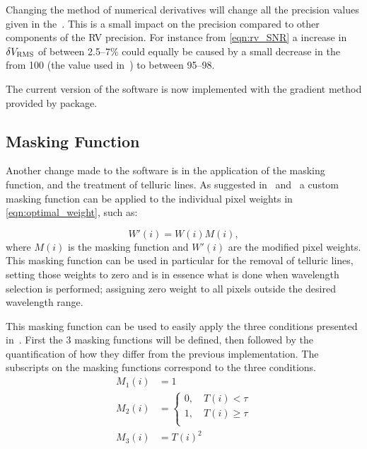 Changing the method of numerical derivatives will change all the precision values given in the~\citet{figueira_radial_2016}.
This is a small impact on the precision compared to other components of the {RV} precision.
For instance from \cref{eqn:rv_SNR} a increase in \(\delta V_{\textrm{RMS}}\) of between 2.5--7\%  could equally be caused by a small decrease in the \snr{} from 100 (the value used in~\citet{figueira_radial_2016}) to between 95--98.

The current version of the software is now implemented with the gradient method provided by \numpy{} package.

\subsection{Masking Function}
\label{subsec:masking_function}
Another change made to the software is in the application of the masking function, and the treatment of telluric lines.
As suggested in~\citet{connes_absolute_1985} and~\citet{bouchy_fundamental_2001} a custom masking function can be applied to the individual pixel weights in \cref{eqn:optimal_weight}, such as:

\[W'(i) = W(i)M(i),\label{eqn:mask_function}\] where \(M(i)\) is the masking function and \(W'(i)\) are the modified pixel weights.
This masking function can be used in particular for the removal of telluric lines, setting those weights to zero and is in essence what is done when wavelength selection is performed; assigning zero weight to all pixels outside the desired wavelength range.

This masking function can be used to easily apply the three conditions presented in~\citet{figueira_radial_2016}.
First the 3 masking functions will be defined, then followed by the quantification of how they differ from the previous implementation.
The subscripts on the masking functions correspond to the three conditions.
\begin{align}
M_1(i) &= 1 \label{eqn:mask1}\\
M_2(i) &= \begin{cases}
0, \hspace{1em} T(i) < \tau\\
1, \hspace{1em} T(i) \ge \tau\\
\end{cases}\label{eqn:mask2}\\
M_3(i) &= {T(i)}^{2} \label{eqn:mask3}
\end{align}

